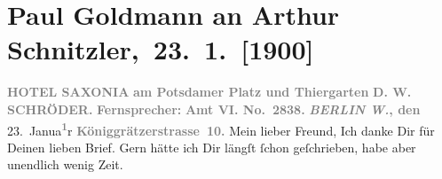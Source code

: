 

         
         \renewcommand{\erwaehntePersonen}{Personen: Richard Beer-Hofmann, Auguste Glümer, Marie Glümer, Eva Marie Goldmann, D. W. Schröder}
         \renewcommand{\erwaehnteOrte}{Orte: Berlin, Florenz, Hotel Saxonia, Passauerstraße, Potsdamer Platz, Stresemannstraße, Tiergarten, Wien}
         \renewcommand{\erwaehnteWerke}{}
               \section[ Paul Goldmann an Arthur Schnitzler, 23. 1. {[}1900{]}]{ Paul Goldmann an Arthur Schnitzler, 23. 1. {[}1900{]}}\nopagebreak{}\rehead{ }\begin{ledgroupsized}[t]{13cm}\normalsize\beginnumbering \toendnotes[C]{\smallbreak\pagebreak[2]} 
\toendnotes[C]{\smallbreak}\pstart
           \noindent{}\centering{}{\pb}\textcolor{gray}{\textbf{\textbf{HOTEL SAXONIA}}}\pend
           \pstart
           \noindent{}\raggedleft{}\textcolor{gray}{\textbf{am Potsdamer Platz und
                        Thiergarten}}\pend
           \pstart
           \noindent{}\centering{}\textcolor{gray}{\textbf{D. W. SCHRÖDER.}}\pend
           \pstart
           \noindent{}\textcolor{gray}{\textbf{Fernsprecher:}}\pend
           \pstart
           \textcolor{gray}{\textbf{\textbf{Amt VI. No. 2838.}}}\pend
           \pstart
           \raggedleft{}\textcolor{gray}{\textbf{\emph{BERLIN W.}, den}}{ }23. Janua\substVorne{}\textsuperscript{\textcolor{gray}{\textbf{1}}}\substDazwischen{}r\substHinten{}\pend
           \pstart
           \raggedleft{}\textcolor{gray}{\textbf{Königgrätzerstrasse 10.}}\pend
           \pstart{}Mein lieber Freund,\pend\pstart
           Ich danke Dir für Deinen lieben Brief. Gern hätte ich Dir längſt ſchon geſchrieben,
               habe aber unendlich wenig Zeit.\pend

\end{ledgroupsized}
